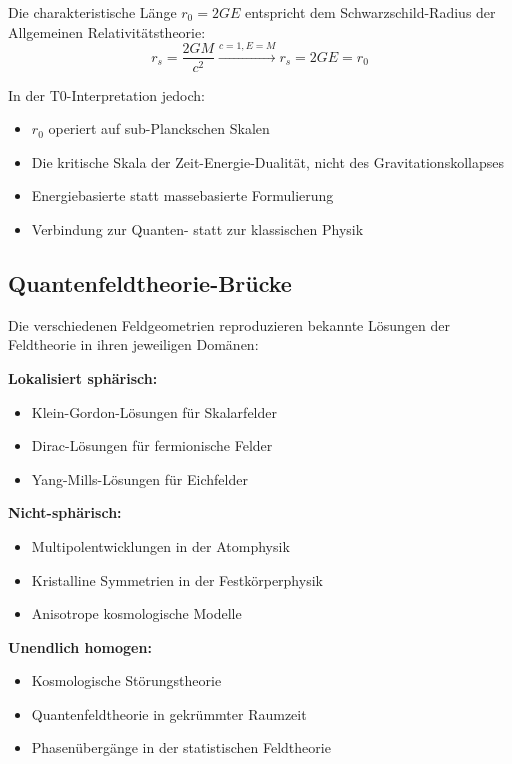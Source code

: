 \documentclass[12pt,a4paper]{report}
\newcommand{\rzero}{r_0}                  %
\begin{document}
	Die charakteristische Länge $\rzero = 2GE$ entspricht dem Schwarzschild-Radius der Allgemeinen Relativitätstheorie:
	\begin{equation}
		r_s = \frac{2GM}{c^2} \xrightarrow{c=1, E=M} r_s = 2GE = \rzero
	\end{equation}
	
	In der T0-Interpretation jedoch:
	\begin{itemize}
		\item $\rzero$ operiert auf sub-Planckschen Skalen
		\item Die kritische Skala der Zeit-Energie-Dualität, nicht des Gravitationskollapses
		\item Energiebasierte statt massebasierte Formulierung
		\item Verbindung zur Quanten- statt zur klassischen Physik
	\end{itemize}
	
	\subsection{Quantenfeldtheorie-Brücke}
	\label{subsec:qft_bridge}
	
	Die verschiedenen Feldgeometrien reproduzieren bekannte Lösungen der Feldtheorie in ihren jeweiligen Domänen:
	
	\textbf{Lokalisiert sphärisch:} 
	\begin{itemize}
		\item Klein-Gordon-Lösungen für Skalarfelder
		\item Dirac-Lösungen für fermionische Felder
		\item Yang-Mills-Lösungen für Eichfelder
	\end{itemize}
	
	\textbf{Nicht-sphärisch:}
	\begin{itemize}
		\item Multipolentwicklungen in der Atomphysik
		\item Kristalline Symmetrien in der Festkörperphysik
		\item Anisotrope kosmologische Modelle
	\end{itemize}
	
	\textbf{Unendlich homogen:}
	\begin{itemize}
		\item Kosmologische Störungstheorie
		\item Quantenfeldtheorie in gekrümmter Raumzeit
		\item Phasenübergänge in der statistischen Feldtheorie
	\end{itemize}
	
\end{document}
